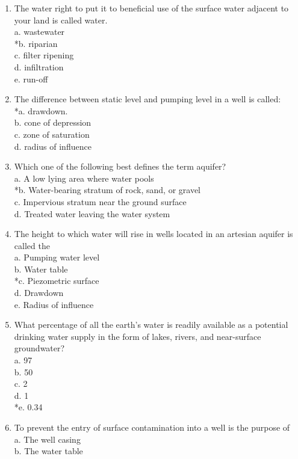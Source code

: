 \begin{enumerate}[1.]
\item The water right to put it to beneficial use of the surface water adjacent to your land is called water.\\
a. wastewater\\
*b. riparian\\
c. filter ripening\\
d. infiltration\\
e. run-off\\
\item The difference between static level and pumping level in a well is called:\\
*a. drawdown.\\
b. cone of depression\\
c. zone of saturation\\
d. radius of influence\\
\item Which one of the following best defines the term aquifer?\\
 a. A low lying area where water pools\\
 *b. Water-bearing stratum of rock, sand, or gravel\\
 c. Impervious stratum near the ground surface\\
 d. Treated water leaving the water system\\
 \item The height to which water will rise in wells located in an artesian aquifer is called the\\
 a. Pumping water level\\
 b. Water table\\
 *c. Piezometric surface\\
 d. Drawdown\\
 e. Radius of influence\\
 \item What percentage of all the earth's water is readily available as a potential drinking water supply in the form of lakes, rivers, and near-surface groundwater?\\
 a. 97\\
 b. 50\\
 c. 2\\
 d. 1\\
 *e. 0.34\\
 \item To prevent the entry of surface contamination into a well is the purpose of\\
 a. The well casing\\
 b. The water table\\

\end{enumerate}
